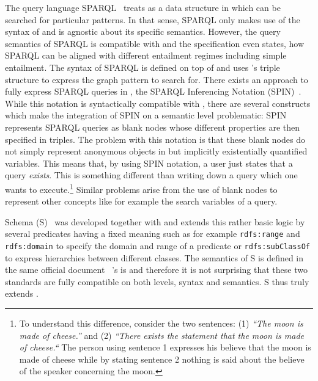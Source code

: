 The query language SPARQL~\cite{sparql} treats \rdf as a data structure in which can be searched for particular patterns. In that sense, SPARQL only makes use of the syntax of \rdf and 
is agnostic about its specific semantics. However, the query semantics of SPARQL is compatible with \rdf and the specification even states, how SPARQL can be aligned with different 
entailment regimes including simple \rdf entailment.  The syntax of SPARQL is defined on top of \rdf and uses \rdf's  triple structure to express the graph pattern to search for. 
There exists an approach to fully express SPARQL
queries in \rdf, the SPARQL Inferencing Notation (SPIN)~\cite{spin}. 
While this notation is syntactically compatible with \rdf, there are several constructs which make the integration of SPIN on a semantic level problematic:
SPIN represents SPARQL queries as blank nodes whose different properties are then specified in \rdf triples. The problem with this notation is that these blank nodes do 
not simply represent anonymous objects in \rdf but implicitly existentially quantified variables. This means that, by using SPIN notation, a user just states that a 
query \emph{exists}. This is something different than writing down a query which one wants to execute.\footnote{
To understand this difference, consider the two sentences: (1) \emph{``The moon is made of cheese.''} and (2) \emph{``There exists the statement that the moon is made of cheese.``}
The person using sentence 1 expresses his believe that the moon is made of cheese while by stating sentence 2 nothing is said about the believe of the speaker concerning the moon.
} 
Similar problems arise from the use of blank nodes to represent other concepts like for example the search variables of a query. 



\rdf Schema (\rdf{}S)~\cite{RDFS} was developed together with \rdf and extends this rather basic logic by several predicates having a fixed meaning such as for example 
\texttt{rdfs:range} and \texttt{rdfs:domain} to specify the domain and range of a predicate or \texttt{rdfs:subClassOf} to express hierarchies between different classes.
The semantics of \rdf{}S is defined in the same official document~\cite{RDFSemantics} \rdf's is and therefore it is not surprising that these two standards are fully compatible
on both levels, syntax and semantics. 
\rdf{}S thus truly extends \rdf. 

